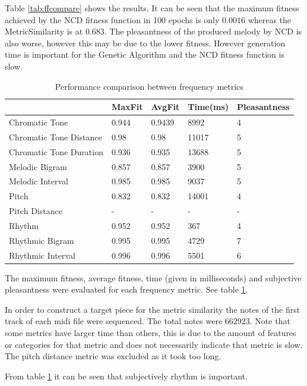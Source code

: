 Table \ref{tab:ffcompare} shows the results. It can be seen that the maximum fitness achieved by the \ac{NCD} fitness function in 100 epochs is only $0.0016$ whereas the MetricSimilarity is at $0.683$. The pleasantness of the produced melody by \ac{NCD} is also worse, however this may be due to the lower fitness.
However generation time is important for the Genetic Algorithm and the \ac{NCD} fitness function is slow.


\begin{table}[htbp]
  \centering
  \caption{Performance comparison between frequency metrics}
    \begin{tabular}{l|llll}
    \toprule
          & MaxFit & AvgFit & Time(ms) & Pleasantness \\
    \midrule
    Chromatic Tone & 0.944 & 0.9439 & 8992  & 4 \\
    Chromatic Tone Distance & 0.98  & 0.98  & 11017 & 5 \\
    Chromatic Tone Duration & 0.936 & 0.935 & 13688 & 5 \\
    Melodic Bigram & 0.857 & 0.857 & 3900  & 5 \\
    Melodic Interval & 0.985 & 0.985 & 9037  & 5 \\
    Pitch & 0.832 & 0.832 & 14001 & 4 \\
    Pitch Distance & -     & -     & -     & - \\
    Rhythm & 0.952 & 0.952 & 367   & 4 \\
    Rhythmic Bigram & 0.995 & 0.995 & 4729  & 7 \\
    Rhythmic Interval & 0.996 & 0.996 & 5501  & 6 \\
    \bottomrule
    \end{tabular}%
  \label{tab:metriccomp}%
\end{table}%

The maximum fitness, average fitness, time (given in milliseconds) and subjective pleasantness were evaluated for each frequency metric. See table \ref{tab:metriccomp}. 

In order to construct a target piece for the metric similarity the notes of the first track of each midi file were sequenced. The total notes were $662923$. Note that some metrics have larger time than others, this is due to the amount of features or categories for that metric and does not necessarily indicate that metric is slow. The pitch distance metric was excluded as it took too long.

From table \ref{tab:metriccomp} it can be seen that subjectively rhythm is important.




